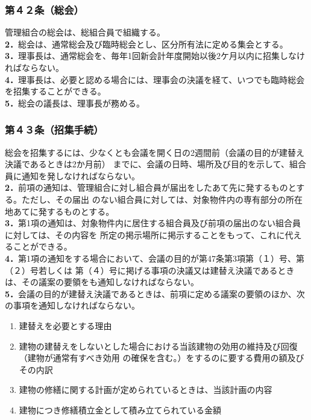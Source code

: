 \documentclass[12pt,uplatex,dvipdfmx]{jsarticle}
\begin{document}
\subsubsection*{第４２条（総会）}
管理組合の総会は、総組合員で組織する。\\
\textbf{2．}総会は、通常総会及び臨時総会とし、区分所有法に定める集会とする。\\
\textbf{3．}理事長は、通常総会を、毎年1回新会計年度開始以後2ケ月以内に招集しなければならない。\\
\textbf{4．}理事長は、必要と認める場合には、理事会の決議を経て、いつでも臨時総会を招集することができる。\\
\textbf{5．}総会の議長は、理事長が務める。

\subsubsection*{第４３条（招集手続）}
総会を招集するには、少なくとも会議を開く日の2週間前（会議の目的が建替え決議であるときは2か月前）
までに、会議の日時、場所及び目的を示して、組合員に通知を発しなければならない。\\
\textbf{2．}前項の通知は、管理組合に対し組合員が届出をしたあて先に発するものとする。ただし、その届出
のない組合員に対しては、対象物件内の専有部分の所在地あてに発するものとする。\\
\textbf{3．}第1項の通知は、対象物件内に居住する組合員及び前項の届出のない組合員に対しては、その内容を
所定の掲示場所に掲示することをもって、これに代えることができる。\\
\textbf{4．}第1項の通知をする場合において、会議の目的が第47条第3項第（１）号、第（２）号若しくは
第（４）号に掲げる事項の決議又は建替え決議であるときは、その議案の要領をも通知しなければならない。\\
\textbf{5．}会議の目的が建替え決議であるときは、前項に定める議案の要領のほか、次の事項を通知しなければならない。
\begin{enumerate}
  \item 建替えを必要とする理由
  \item 建物の建替えをしないとした場合における当該建物の効用の維持及び回復（建物が通常有すべき効用
        の確保を含む。）をするのに要する費用の額及びその内訳
  \item 建物の修繕に関する計画が定められているときは、当該計画の内容
  \item 建物につき修繕積立金として積み立てられている金額
\end{enumerate}
\end{document}

